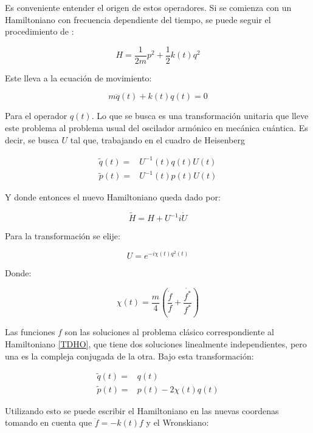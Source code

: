 \documentclass[a4paper,10pt]{report}
\begin{document}
Es conveniente entender el origen de estos operadores. Si se comienza con un Hamiltoniano con frecuencia dependiente del tiempo, se puede seguir el procedimiento de \cite{BrownPT}:

\begin{equation}\label{TDHO}
H = \frac{1}{2m}p^2 + \frac{1}{2}k(t)q^2
\end{equation}

Este lleva a la ecuación de movimiento:

\begin{equation}
m\ddot{q}(t) + k(t)q(t) = 0
\end{equation}

Para el operador $q(t)$. Lo que se busca es una transformación unitaria que lleve este problema al problema usual del oscilador armónico en mecánica cuántica. Es decir, se busca $U$ tal que, trabajando en el cuadro de Heisenberg \cite{SakuraiQM}

\begin{align}
\tilde{q}(t) =& U^{-1}(t)q(t)U(t)\\
\tilde{p}(t) =& U^{-1}(t)p(t)U(t)
\end{align}

Y donde entonces el nuevo Hamiltoniano queda dado por:

\begin{equation}
\tilde{H} = H + U^{-1}i\dot{U}
\end{equation}

Para la transformación se elije:

\begin{equation}
U = e^{-i\chi(t)q^2(t)}
\end{equation}

Donde:

\begin{equation}
\chi(t) = \frac{m}{4}(\frac{\dot{f}}{f}+\frac{\dot{f^*}}{f^*})
\end{equation}

Las funciones $f$ son las soluciones al problema clásico correspondiente al Hamiltoniano \ref{TDHO}, que tiene dos soluciones linealmente independientes, pero una es la compleja conjugada de la otra. Bajo esta transformación:

\begin{align}
\tilde{q}(t)=&q(t)\\
\tilde{p}(t)=&p(t)-2\chi(t)q(t)
\end{align}

Utilizando esto se puede escribir el Hamiltoniano en las nuevas coordenas tomando en cuenta que $\ddot{f}= -k(t)f$ y el Wronskiano:
\end{document}
